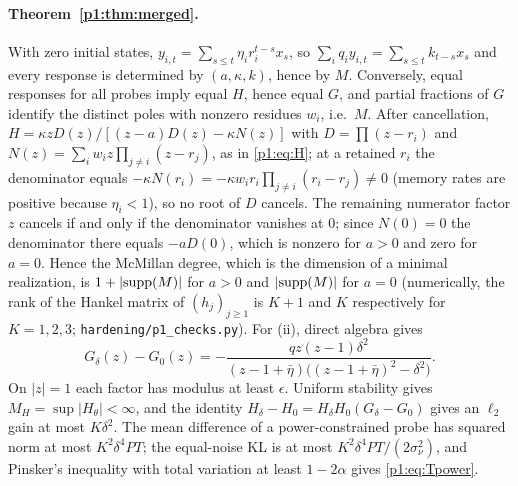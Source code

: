 \paragraph{Theorem~\ref{p1:thm:merged}.} With zero initial states, $y_{i,t}=\sum_{s\le t}\eta_ir_i^{t-s}x_s$, so $\sum_iq_iy_{i,t}=\sum_{s\le t}k_{t-s}x_s$ and every response is determined by $(a,\kappa,k)$, hence by $M$. Conversely, equal responses for all probes imply equal $H$, hence equal $G$, and partial fractions of $G$ identify the distinct poles with nonzero residues $w_i$, i.e.\ $M$. After cancellation, $H=\kappa zD(z)/[(z-a)D(z)-\kappa N(z)]$ with $D=\prod(z-r_i)$ and $N(z)=\sum_iw_iz\prod_{j\ne i}(z-r_j)$, as in \eqref{p1:eq:H}; at a retained $r_i$ the denominator equals $-\kappa N(r_i)=-\kappa w_ir_i\prod_{j\ne i}(r_i-r_j)\neq0$ (memory rates are positive because $\eta_i<1$), so no root of $D$ cancels. The remaining numerator factor $z$ cancels if and only if the denominator vanishes at $0$; since $N(0)=0$ the denominator there equals $-aD(0)$, which is nonzero for $a>0$ and zero for $a=0$. Hence the McMillan degree, which is the dimension of a minimal realization, is $1+|{\rm supp}(M)|$ for $a>0$ and $|{\rm supp}(M)|$ for $a=0$ (numerically, the rank of the Hankel matrix of $(h_j)_{j\ge1}$ is $K+1$ and $K$ respectively for $K=1,2,3$; \texttt{hardening/p1\_checks.py}). For (ii), direct algebra gives
\[
G_\delta(z)-G_0(z)=-\frac{qz(z-1)\delta^2}{(z-1+\bar\eta)\bigl((z-1+\bar\eta)^2-\delta^2\bigr)} .
\]
On $|z|=1$ each factor has modulus at least $\epsilon$. Uniform stability gives $M_H=\sup|H_\theta|<\infty$, and the identity $H_\delta-H_0=H_\delta H_0(G_\delta-G_0)$ gives an $\ell_2$ gain at most $K\delta^2$. The mean difference of a power-constrained probe has squared norm at most $K^2\delta^4PT$; the equal-noise KL is at most $K^2\delta^4PT/(2\sigma_\nu^2)$, and Pinsker's inequality with total variation at least $1-2\alpha$ gives \eqref{p1:eq:Tpower}.

